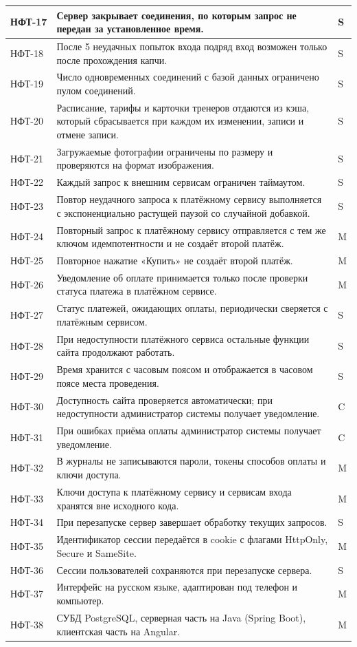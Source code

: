 \documentclass[14pt,a4paper]{extarticle}
\begin{document}
\begin{xltabular}{\textwidth}{|p{1.6cm}|L|>{\centering\arraybackslash}p{2.1cm}|}
  НФТ-17 & Сервер закрывает соединения, по которым запрос не передан за установленное время. & S \\ \hline
  НФТ-18 & После 5 неудачных попыток входа подряд вход возможен только после прохождения капчи. & S \\ \hline
  НФТ-19 & Число одновременных соединений с базой данных ограничено пулом соединений. & S \\ \hline
  НФТ-20 & Расписание, тарифы и карточки тренеров отдаются из кэша, который сбрасывается при каждом их изменении, записи и отмене записи. & S \\ \hline
  НФТ-21 & Загружаемые фотографии ограничены по размеру и проверяются на формат изображения. & S \\ \hline
  НФТ-22 & Каждый запрос к внешним сервисам ограничен таймаутом. & S \\ \hline
  НФТ-23 & Повтор неудачного запроса к платёжному сервису выполняется с экспоненциально растущей паузой со случайной добавкой. & S \\ \hline
  НФТ-24 & Повторный запрос к платёжному сервису отправляется с тем же ключом идемпотентности и не создаёт второй платёж. & M \\ \hline
  НФТ-25 & Повторное нажатие «Купить» не создаёт второй платёж. & M \\ \hline
  НФТ-26 & Уведомление об оплате принимается только после проверки статуса платежа в платёжном сервисе. & M \\ \hline
  НФТ-27 & Статус платежей, ожидающих оплаты, периодически сверяется с платёжным сервисом. & S \\ \hline
  НФТ-28 & При недоступности платёжного сервиса остальные функции сайта продолжают работать. & S \\ \hline
  НФТ-29 & Время хранится с часовым поясом и отображается в часовом поясе места проведения. & S \\ \hline
  НФТ-30 & Доступность сайта проверяется автоматически; при недоступности администратор системы получает уведомление. & C \\ \hline
  НФТ-31 & При ошибках приёма оплаты администратор системы получает уведомление. & C \\ \hline
  НФТ-32 & В журналы не записываются пароли, токены способов оплаты и ключи доступа. & M \\ \hline
  НФТ-33 & Ключи доступа к платёжному сервису и сервисам входа хранятся вне исходного кода. & M \\ \hline
  НФТ-34 & При перезапуске сервер завершает обработку текущих запросов. & S \\ \hline
  НФТ-35 & Идентификатор сессии передаётся в cookie с флагами HttpOnly, Secure и SameSite. & M \\ \hline
  НФТ-36 & Сессии пользователей сохраняются при перезапуске сервера. & S \\ \hline
  НФТ-37 & Интерфейс на русском языке, адаптирован под телефон и компьютер. & M \\ \hline
  НФТ-38 & СУБД PostgreSQL, серверная часть на Java (Spring Boot), клиентская часть на Angular. & M \\ \hline
\end{xltabular}
\end{document}
